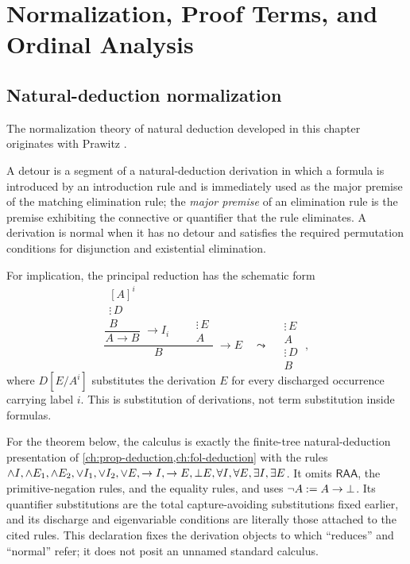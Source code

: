 \chapter[Normalization and Ordinal Analysis]{Normalization, Proof Terms, and Ordinal Analysis}
\label{ch:normalization-curry-howard}

\section{Natural-deduction normalization}
\label{sec:normalization-curry-howard-01}

The normalization theory of natural deduction developed in this chapter
originates with Prawitz \cite{Prawitz1965}.

\begin{definition}[Detour]
A detour is a segment of a natural-deduction derivation in which a formula is
introduced by an introduction rule and is immediately used as the major
premise of the matching elimination rule; the \emph{major premise} of an
elimination rule is the premise exhibiting the connective or quantifier
that the rule eliminates.  A derivation is normal when it has
no detour and satisfies the required permutation conditions for disjunction
and existential elimination.
\end{definition}

For implication, the principal reduction has the schematic form
\[
  \dfrac{
    \dfrac{\begin{matrix}{[A]}^i\\ \vdots\,D\\ B\end{matrix}}
          {A\to B}\;\to I_i
    \qquad
    \begin{matrix}\vdots\,E\\ A\end{matrix}
  }{B}\;\to E
  \quad\leadsto\quad
  \begin{matrix}\vdots\,E\\ A\\ \vdots\,D\\ B\end{matrix}\;,
\]
where \(D[E/A^i]\) substitutes the derivation \(E\) for every discharged
occurrence carrying label \(i\).  This is substitution of derivations, not term
substitution inside formulas.

For the theorem below, the calculus is exactly the finite-tree
natural-deduction presentation of \cref{ch:prop-deduction,ch:fol-deduction}
with the rules
\(\land I,\land E_1,\land E_2,\lor I_1,\lor I_2,\lor E,\to I,\to E,
\bot E,\forall I,\forall E,\exists I,\exists E\).  It omits
\(\mathsf{RAA}\), the primitive-negation rules, and the equality rules, and
uses \(\neg A\mathrel{:=} A\to\bot\).  Its quantifier substitutions are the total
capture-avoiding substitutions fixed earlier, and its discharge and
eigenvariable conditions are literally those attached to the cited rules.
This declaration fixes the derivation objects to which ``reduces'' and
``normal'' refer; it does not posit an unnamed standard calculus.

